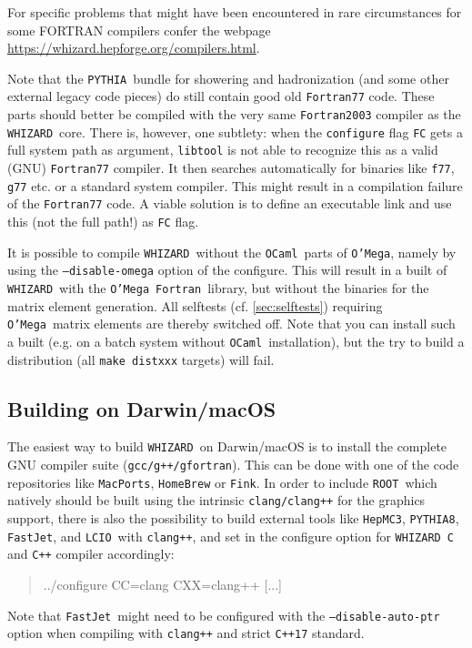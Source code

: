 \documentclass[12pt]{book}
\newcommand{\ttt}[1]{\texttt{#1}}
\newcommand{\whizard}{\ttt{WHIZARD}}
\newcommand{\oMega}{\ttt{O'Mega}}
\newcommand{\pythia}{\ttt{PYTHIA}}
\newcommand{\pythiaeight}{\ttt{PYTHIA8}}
\newcommand{\lcio}{\ttt{LCIO}}
\newcommand{\hepmcthree}{\ttt{HepMC3}}
\newcommand{\fastjet}{\ttt{FastJet}}
\newcommand{\ROOT}{\ttt{ROOT}}
\newcommand{\fortran}{\ttt{Fortran}}
\newcommand{\ocaml}{\ttt{OCaml}}
\begin{document}
For specific problems that might have been encountered in rare
circumstances for some FORTRAN compilers confer the webpage
\url{https://whizard.hepforge.org/compilers.html}.

Note that the \pythia\  bundle for showering and hadronization (and
some other external legacy code pieces) do still contain good old
\ttt{Fortran77} code. These parts should better be
compiled with the very same \ttt{Fortran2003} compiler as the
\whizard\ core. There is, however, one subtlety:
when the \ttt{configure} flag \ttt{FC} gets a full system path as
argument, \ttt{libtool} is not able to recognize this as a valid (GNU)
\ttt{Fortran77} compiler. It then searches automatically for binaries
like \ttt{f77}, \ttt{g77} etc. or a standard system compiler. This
might result in a compilation failure of the \ttt{Fortran77} code. A
viable solution is to define an executable link and use this (not the
full path!) as \ttt{FC} flag.

It is possible to compile \whizard\ without the \ocaml\ parts of
\oMega, namely by using the \ttt{--disable-omega} option of the
configure. This will result in a built of \whizard\ with the \oMega\
\fortran\ library, but without the binaries for the matrix element
generation. All selftests (cf. \ref{sec:selftests}) requiring \oMega\
matrix elements are thereby switched off. Note that you can install
such a built (e.g. on a batch system without \ocaml\ installation), but
the try to build a distribution (all \ttt{make distxxx} targets) will fail.


\subsection{Building on Darwin/macOS}

The easiest way to build \whizard\ on Darwin/macOS is to install the
complete GNU compiler suite (\ttt{gcc/g++/gfortran}). This can be done
with one of the code repositories like \ttt{MacPorts}, \ttt{HomeBrew}
or \ttt{Fink}. In order to include \ROOT\ which natively should be
built using the intrinsic \ttt{clang/clang++} for the graphics
support, there is also the possibility to build external tools like
\hepmcthree, \pythiaeight, \fastjet, and \lcio\ with \ttt{clang++},
and set in the configure option for \whizard\ \ttt{C} and \ttt{C++}
compiler accordingly:
\begin{quote}
  ../configure CC=clang CXX=clang++ [...]
\end{quote}
Note that \fastjet\ might need to be configured with the
\ttt{--disable-auto-ptr} option when compiling with \ttt{clang++}
and strict \ttt{C++17} standard.
\end{document}
